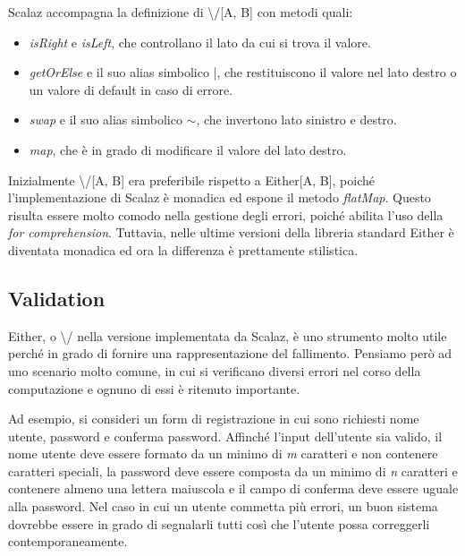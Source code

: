 Scalaz accompagna la definizione di \textbackslash/[A, B] con metodi quali:

\begin{itemize}
\item \textit{isRight} e \textit{isLeft}, che controllano il lato da cui si trova il valore.
\item \textit{getOrElse} e il suo alias simbolico |, che restituiscono il valore nel lato destro o un valore di default in caso di errore.
\item \textit{swap} e il suo alias simbolico $\sim$, che invertono lato sinistro e destro.
\item \textit{map}, che è in grado di modificare il valore del lato destro.
\end{itemize}

Inizialmente \textbackslash/[A, B] era preferibile rispetto a Either[A, B], poiché l'implementazione di Scalaz è monadica ed espone il metodo \textit{flatMap}. Questo risulta essere molto comodo nella gestione degli errori, poiché abilita l'uso della \textit{for comprehension}. Tuttavia, nelle ultime versioni della libreria standard Either è diventata monadica ed ora la differenza è prettamente stilistica.



\subsection{Validation}

Either, o \textbackslash/ nella versione implementata da Scalaz, è uno strumento molto utile perché in grado di fornire una rappresentazione del fallimento. Pensiamo però ad uno scenario molto comune, in cui si verificano diversi errori nel corso della computazione e ognuno di essi è ritenuto importante.

Ad esempio, si consideri un form di registrazione in cui sono richiesti nome utente, password e conferma password. Affinché l'input dell'utente sia valido, il nome utente deve essere formato da un minimo di \textit{m} caratteri e non contenere caratteri speciali, la password deve essere composta da un minimo di \textit{n} caratteri e contenere almeno una lettera maiuscola e il campo di conferma deve essere uguale alla password. Nel caso in cui un utente commetta più errori, un buon sistema dovrebbe essere in grado di segnalarli tutti così che l'utente possa correggerli contemporaneamente.

